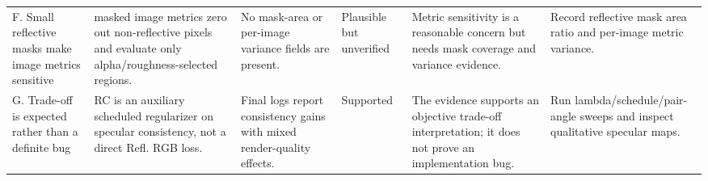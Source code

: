 \begin{table}[t]
{\begin{tabular}{llllll}
F. Small reflective masks make image metrics sensitive & masked image metrics zero out non-reflective pixels and evaluate only alpha/roughness-selected regions. & No mask-area or per-image variance fields are present. & Plausible but unverified & Metric sensitivity is a reasonable concern but needs mask coverage and variance evidence. & Record reflective mask area ratio and per-image metric variance. \\
G. Trade-off is expected rather than a definite bug & RC is an auxiliary scheduled regularizer on specular consistency, not a direct Refl. RGB loss. & Final logs report consistency gains with mixed render-quality effects. & Supported & The evidence supports an objective trade-off interpretation; it does not prove an implementation bug. & Run lambda/schedule/pair-angle sweeps and inspect qualitative specular maps. \\
\bottomrule
\end{tabular}
}
\end{table}

